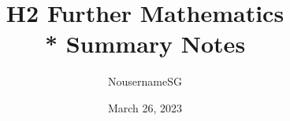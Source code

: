 
\title{H2 Further Mathematics \\* Summary Notes}
\author{NousernameSG}
\date{March 26, 2023}



\maketitle

\newpage \ \newpage \ \newpage

{\onecolumn \setcounter{tocdepth}{2} \tableofcontents} \newpage
\twocolumn

 \newpage
 \newpage
 \newpage
 \newpage
 \newpage
 \newpage
 \newpage


